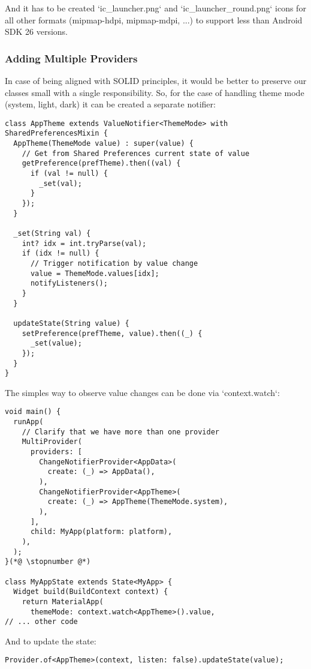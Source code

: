 And it has to be created `ic\_launcher.png` and `ic\_launcher\_round.png` icons for all other formats (mipmap-hdpi, 
mipmap-mdpi, ...) to support less than Android SDK 26 versions.


\subsubsection{Adding Multiple Providers}

In case of being aligned with SOLID principles, it would be better to preserve our classes small with a single 
responsibility. So, for the case of handling theme mode (system, light, dark) it can be created a separate notifier:

\begin{lstlisting}
class AppTheme extends ValueNotifier<ThemeMode> with SharedPreferencesMixin {
  AppTheme(ThemeMode value) : super(value) {
    // Get from Shared Preferences current state of value
    getPreference(prefTheme).then((val) {
      if (val != null) {
        _set(val);
      }
    });
  }

  _set(String val) {
    int? idx = int.tryParse(val);
    if (idx != null) {
      // Trigger notification by value change
      value = ThemeMode.values[idx];
      notifyListeners();
    }
  }

  updateState(String value) {
    setPreference(prefTheme, value).then((_) {
      _set(value);
    });
  }
}
\end{lstlisting}

\noindent The simples way to observe value changes can be done via `context.watch`:

\begin{lstlisting}
void main() {
  runApp(
    // Clarify that we have more than one provider
    MultiProvider(
      providers: [
        ChangeNotifierProvider<AppData>(
          create: (_) => AppData(),
        ),
        ChangeNotifierProvider<AppTheme>(
          create: (_) => AppTheme(ThemeMode.system),
        ),
      ],
      child: MyApp(platform: platform),
    ),
  );
}(*@ \stopnumber @*)

class MyAppState extends State<MyApp> {
  Widget build(BuildContext context) {
    return MaterialApp(
      themeMode: context.watch<AppTheme>().value,
// ... other code
\end{lstlisting}

\noindent And to update the state:

\begin{lstlisting}
Provider.of<AppTheme>(context, listen: false).updateState(value);
\end{lstlisting}

